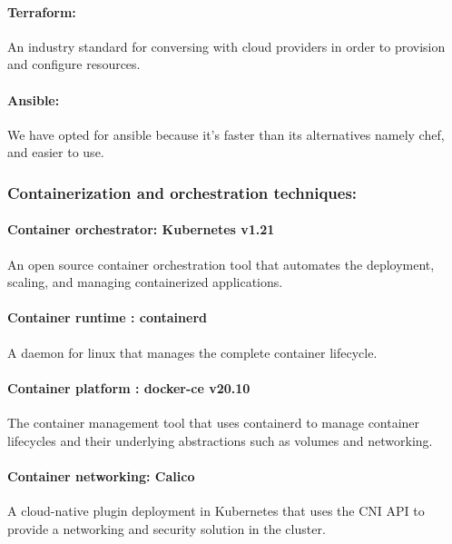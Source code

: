 \paragraph{Terraform: }

An industry standard for conversing with cloud providers in order to provision and configure resources. 

\paragraph{Ansible: }

We have opted for ansible because it’s faster than its alternatives namely chef, and easier to use.  

\subsubsection{Containerization and orchestration techniques: }

\paragraph{Container orchestrator: Kubernetes v1.21 }

An open source container orchestration tool that automates the deployment, scaling, and managing containerized applications. 

\paragraph{Container runtime : containerd }

A daemon for linux that manages the complete container lifecycle. 

\paragraph{Container platform : docker-ce v20.10 }

The container management tool that uses containerd to manage container lifecycles and their underlying abstractions such as volumes and networking.  

\paragraph{Container networking: Calico }

A cloud-native plugin deployment in Kubernetes that uses the CNI API to provide a networking and security solution in the cluster. 

